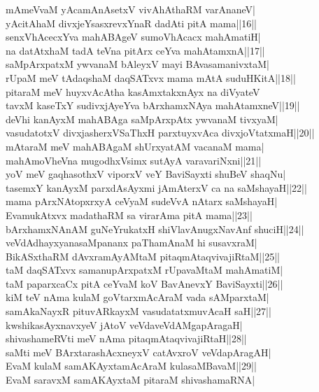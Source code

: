 \documentclass{article}
\begin{document}
mAmeVvaM yAcamAnAsetxV vivAhAthaRM varAnaneV|\\
yAcitAhaM divxjeYsasxrevxYnaR dadAti pitA mama||16||\\
senxVhAcecxYva mahABAgeV sumoVhAcacx mahAmatiH|\\
na datAtxhaM tadA teVna pitArx ceYva mahAtamxnA||17||\\
saMpArxpatxM ywvanaM bAleyxV mayi BAvasamanivxtaM|\\
rUpaM meV tAdaqshaM daqSATxvx mama mAtA suduHKitA||18||\\
pitaraM meV huyxvAcAtha kasAmxtakxnAyx na diVyateV\\
tavxM kaseTxY sudivxjAyeYva bArxhamxNAya mahAtamxneV||19||\\
deVhi kanAyxM mahABAga saMpArxpAtx ywvanaM tivxyaM|\\
vasudatotxV divxjasherxVSaThxH parxtuyxvAca divxjoVtatxmaH||20||\\
mAtaraM meV mahABAgaM shUrxyatAM vacanaM mama|\\
mahAmoVheVna mugodhxVsimx sutAyA varavariNxni||21||\\
yoV meV gaqhasothxV viporxV veY BaviSayxti shuBeV shaqNu|\\
tasemxY kanAyxM parxdAsAyxmi jAmAterxV ca na saMshayaH||22||\\
mama pArxNAtopxrxyA ceVyaM sudeVvA nAtarx saMshayaH|\\
EvamukAtxvx madathaRM sa virarAma pitA mama||23||\\
bArxhamxNAnAM guNeYrukatxH shiVlavAnugxNavAnf shuciH||24||\\
veVdAdhayxyanasaMpananx paThamAnaM hi susavxraM|\\
BikASxthaRM dAvxramAyAMtaM pitaqmAtaqvivajiRtaM||25||\\
taM daqSATxvx samanupArxpatxM rUpavaMtaM mahAmatiM|\\
taM paparxcaCx pitA ceYvaM koV BavAnevxY BaviSayxti||26||\\
kiM teV nAma kulaM goVtarxmAcAraM vada sAMparxtaM|\\
samAkaNayxR pituvARkayxM vasudatatxmuvAcaH saH||27||\\
kwshikasAyxnavxyeV jAtoV veVdaveVdAMgapAragaH|\\
shivashameRVti meV nAma pitaqmAtaqvivajiRtaH||28||\\
saMti meV BArxtarashAcxneyxV catAvxroV veVdapAragAH|\\
EvaM kulaM samAKAyxtamAcAraM kulasaMBavaM||29||\\
EvaM saravxM samAKAyxtaM pitaraM shivashamaRNA|\\
\end{document}
